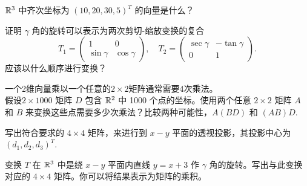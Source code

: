 \begin{problemset}
\item \label{ex:01-08-01} $\mathbb{R}^3$ 中齐次坐标为 $(10, 20, 30, 5)^T$ 的向量是什么？
\item \label{ex:01-08-02} 证明 $\gamma$ 角的旋转可以表示为两次剪切-缩放变换的复合
$$T_1 = \begin{pmatrix} 1 & 0 \\ \sin \gamma & \cos \gamma \end{pmatrix} ,\quad T_2 = \begin{pmatrix} \sec \gamma & -\tan \gamma \\ 0 & 1 \end{pmatrix}.$$
应该以什么顺序进行变换？
\item \label{ex:01-08-03} 一个2维向量乘以一个任意的$2\times 2$矩阵通常需要4次乘法。
\\
假设$2 \times 1000$ 矩阵 $D$ 包含 $\mathbb{R}^2$ 中 1000 个点的坐标。使用两个任意 $2 \times 2$ 矩阵 $A$ 和 $B$ 来变换这些点需要多少次乘法？比较两种可能性，$A(BD)$ 和 $(AB)D$.~
\item \label{ex:01-08-04} 写出符合要求的 $4 \times 4$ 矩阵，来进行到 $x-y$ 平面的透视投影，其投影中心为 $(d_1, d_2, d_3)^T$.~
\item \label{ex:01-08-05} 变换 $T$ 在 $\mathbb{R}^3$ 中是绕 $x-y$ 平面内直线 $y = x+3$ 作 $\gamma$ 角的旋转。写出与此变换对应的 $4 \times 4$ 矩阵。你可以将结果表示为矩阵的乘积。

\end{problemset}









